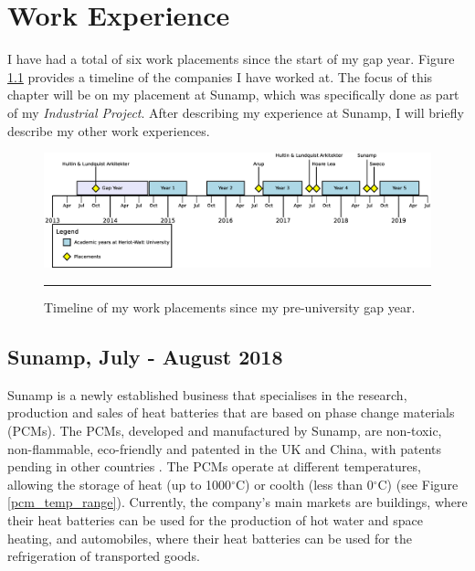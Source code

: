 \chapter{Work Experience} %

\label{Chapter2} %


I have had a total of six work placements since the start of my gap year.
Figure \ref{timeline} provides a timeline of the companies I have worked at.
The focus of this chapter will be on my placement at Sunamp, which was specifically done as part of my \textit{Industrial Project}.
After describing my experience at Sunamp, I will briefly describe my other work experiences.

\begin{figure}[htbp]
	\centering
	\includegraphics[width=\textwidth]{figures/IP-Timeline.eps}
	\rule{\textwidth}{0.5pt} %
	\caption{Timeline of my work placements since my pre-university gap year.}
	\label{timeline}
\end{figure}



\section{Sunamp, July - August 2018}

Sunamp is a newly established business that specialises in the research, production and sales of heat batteries that are based on phase change materials (PCMs).
The PCMs, developed and manufactured by Sunamp, are non-toxic, non-flammable, eco-friendly and patented in the UK and China, with patents pending in other countries \citep{SunampAutomotive}.
The PCMs operate at different temperatures, allowing the storage of heat (up to 1000$^{\circ}$C) or coolth (less than 0$^{\circ}$C) (see Figure \ref{pcm_temp_range}).
Currently, the company's main markets are buildings, where their heat batteries can be used for the production of hot water and space heating, and automobiles, where their heat batteries can be used for the refrigeration of transported goods.

